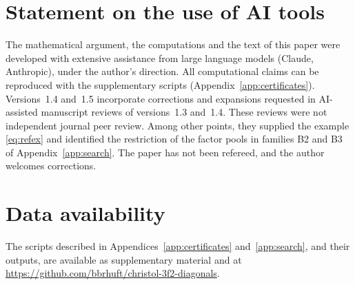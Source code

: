 \documentclass[11pt]{amsart}
\theoremstyle{definition}
\theoremstyle{remark}
\numberwithin{equation}{section}
\begin{document}
\section*{Statement on the use of AI tools}
The mathematical argument, the computations and the text of this paper were developed with extensive assistance from large language models (Claude, Anthropic), under the author's direction. All computational claims can be reproduced with the supplementary scripts (Appendix~\ref{app:certificates}). Versions~1.4 and~1.5 incorporate corrections and expansions requested in AI-assisted manuscript reviews of versions~1.3 and~1.4. These reviews were not independent journal peer review. Among other points, they supplied the example \eqref{eq:refex} and identified the restriction of the factor pools in families B2 and B3 of Appendix~\ref{app:search}. The paper has not been refereed, and the author welcomes corrections.

\section*{Data availability}
The scripts described in Appendices~\ref{app:certificates} and~\ref{app:search}, and their outputs, are available as supplementary material and at \url{https://github.com/bbrhuft/christol-3f2-diagonals}.
\end{document}
